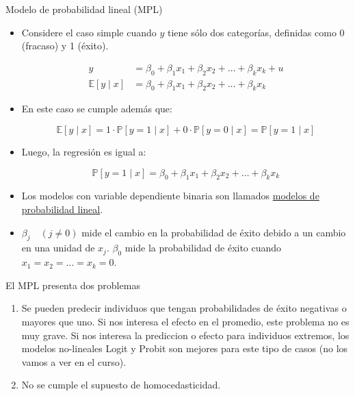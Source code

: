 \documentclass{beamer}
\begin{document}
\begin{frame}{Modelo de probabilidad lineal (MPL)}

{\footnotesize
    \begin{itemize}
    \item Considere el caso simple cuando $y$ tiene sólo dos categorías, definidas como 0 (fracaso) y 1 (éxito).
    
    \begin{align*}
    y &= \beta_0 + \beta_1 x_1 + \beta_2 x_2 + \dots + \beta_k x_k + u \\
    \mathbb{E}[y \mid x] &= \beta_0 + \beta_1 x_1 + \beta_2 x_2 + \dots + \beta_k x_k
    \end{align*}
    
    \item En este caso se cumple además que:
    
    \[
    \mathbb{E}[y \mid x] = 1 \cdot \mathbb{P}[y = 1 \mid x] + 0 \cdot \mathbb{P}[y = 0 \mid x] = \mathbb{P}[y = 1 \mid x]
    \]
    
    \item Luego, la regresión es igual a:
    
    \[
    \mathbb{P}[y = 1 \mid x] = \beta_0 + \beta_1 x_1 + \beta_2 x_2 + \dots + \beta_k x_k
    \]
    
    \item Los modelos con variable dependiente binaria son llamados \underline{modelos de probabilidad lineal}.
    
    \item $\beta_j \quad (j\neq 0)$ mide el cambio en la probabilidad de éxito debido a un cambio en una unidad de $x_j$.
    $\beta_0$ mide la probabilidad de éxito cuando $x_1 = x_2 = \dots = x_k = 0$.
    
\end{itemize}}
\end{frame}

\begin{frame}{El MPL presenta dos problemas}

\begin{enumerate}
    \item  Se pueden predecir individuos que tengan probabilidades de \'exito negativas o
mayores que uno.
Si nos interesa el efecto en el promedio, este problema no es muy grave.
Si nos interesa la prediccion o efecto para individuos extremos, los modelos
no-lineales Logit y Probit son mejores para este tipo de casos (no los vamos a ver
en el curso).
\item No se cumple el supuesto de homocedasticidad.
\end{enumerate}

\end{frame}
\end{document}
